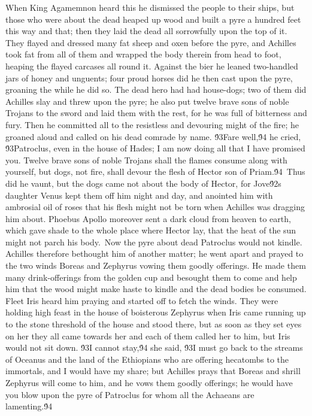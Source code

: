 {When King Agamemnon heard this he dismissed the people to their ships, but those who were about the dead heaped up wood and built a pyre a hundred feet this way and that; then they laid the dead all sorrowfully upon the top of it. They flayed and dressed many fat sheep and oxen before the pyre, and Achilles took fat from all of them and wrapped the body therein from head to foot, heaping the flayed carcases all round it. Against the bier he leaned two-handled jars of honey and unguents; four proud horses did he then cast upon the pyre, groaning the while he did so. The dead hero had had house-dogs; two of them did Achilles slay and threw upon the pyre; he also put twelve brave sons of noble Trojans to the sword and laid them with the rest, for he was full of bitterness and fury. Then he committed all to the resistless and devouring might of the fire; he groaned aloud and called on his dead comrade by name. \'93Fare well,\'94 he cried, \'93Patroclus, even in the house of Hades; I am now doing all that I have promised you. Twelve brave sons of noble Trojans shall the flames consume along with yourself, but dogs, not fire, shall devour the flesh of Hector son of Priam.\'94\
Thus did he vaunt, but the dogs came not about the body of Hector, for Jove\'92s daughter Venus kept them off him night and day, and anointed him with ambrosial oil of roses that his flesh might not be torn when Achilles was dragging him about. Phoebus Apollo moreover sent a dark cloud from heaven to earth, which gave shade to the whole place where Hector lay, that the heat of the sun might not parch his body.\
Now the pyre about dead Patroclus would not kindle. Achilles therefore bethought him of another matter; he went apart and prayed to the two winds Boreas and Zephyrus vowing them goodly offerings. He made them many drink-offerings from the golden cup and besought them to come and help him that the wood might make haste to kindle and the dead bodies be consumed. Fleet Iris heard him praying and started off to fetch the winds. They were holding high feast in the house of boisterous Zephyrus when Iris came running up to the stone threshold of the house and stood there, but as soon as they set eyes on her they all came towards her and each of them called her to him, but Iris would not sit down. \'93I cannot stay,\'94 she said, \'93I must go back to the streams of Oceanus and the land of the Ethiopians who are offering hecatombs to the immortals, and I would have my share; but Achilles prays that Boreas and shrill Zephyrus will come to him, and he vows them goodly offerings; he would have you blow upon the pyre of Patroclus for whom all the Achaeans are lamenting.\'94\
}
